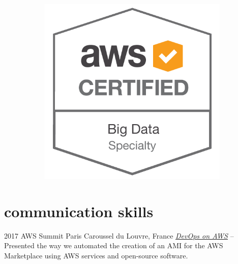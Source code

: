 \documentclass[]{cv-a4}
\begin{document}
\begin{figure}[h!]
\begin{subfigure}[b]{0.2\linewidth}
  \end{subfigure}
  \begin{subfigure}[b]{0.2\linewidth}
    \includegraphics[width=\linewidth]{images/BDS.png}
  \end{subfigure}
\end{figure}



\section{communication skills}

\begin{entrylist}


\entry
{2017}
{AWS Summit Paris}
{Caroussel du Louvre, France}
{\emph{\href{https://youtu.be/54cwFTMPxOo}{DevOps on AWS} } -- Presented the way we automated the creation of an AMI for the AWS Marketplace using AWS services and open-source software.}


\end{entrylist}
\end{document}
